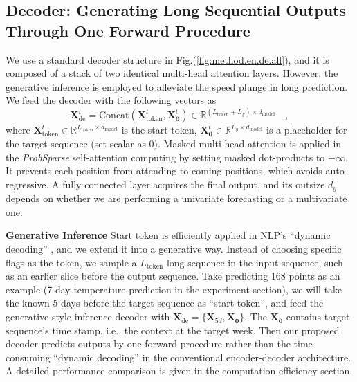 \documentclass[letterpaper]{article} %
\newcommand{\mb}{\mathbf}
\begin{document}
\subsection{Decoder: Generating Long Sequential Outputs Through One Forward Procedure}
\label{sec:method.decoder}
We use a standard decoder structure \cite{vaswani2017attention} in Fig.(\ref{fig:method.en.de.all}), and it is composed of a stack of two identical multi-head attention layers. However, the generative inference is employed to alleviate the speed plunge in long prediction. We feed the decoder with the following vectors as
\begin{equation}\label{eq.method.de_in}
    \mb{X}^t_{\textrm{de}} = \textrm{Concat} ( \mb{X}^t_{\textrm{token}}, \mb{X}^t_{\mb{0}}  ) \in \mathbb{R}^{(L_{\textrm{token}} + L_y) \times d_{\textrm{model}}} \quad,
\end{equation}
where $\mb{X}^t_{\textrm{token}} \in \mathbb{R}^{L_{\textrm{token}} \times d_{\textrm{model}}}$ is the start token, $\mb{X}^t_{\mb{0}} \in \mathbb{R}^{L_y \times d_{\textrm{model}}} $ is a placeholder for the target sequence (set scalar as 0).
Masked multi-head attention is applied in the \emph{ProbSparse} self-attention computing by setting masked dot-products to $-\infty$. It prevents each position from attending to coming positions, which avoids auto-regressive. A fully connected layer acquires the final output, and its outsize $d_y$ depends on whether we are performing a univariate forecasting or a multivariate one.

\textbf{Generative Inference} Start token is efficiently applied in NLP's ``dynamic decoding'' \cite{devlin2018bert}, and we extend it into a generative way. Instead of choosing specific flags as the token, we sample a $L_{\textrm{token}}$ long sequence in the input sequence, such as an earlier slice before the output sequence.
Take predicting 168 points as an example (7-day temperature prediction in the experiment section), we will take the known 5 days before the target sequence as ``start-token'', and feed the generative-style inference decoder with $\mb{X}_{\textrm{de}}=\{\mb{X}_{5d},\mb{X}_{\mb{0}}\}$. The $\mb{X}_{\mb{0}}$ contains target sequence's time stamp, i.e., the context at the target week.
Then our proposed decoder predicts outputs by one forward procedure rather than the time consuming ``dynamic decoding'' in the conventional encoder-decoder architecture. A detailed performance comparison is given in the computation efficiency section.
\end{document}

